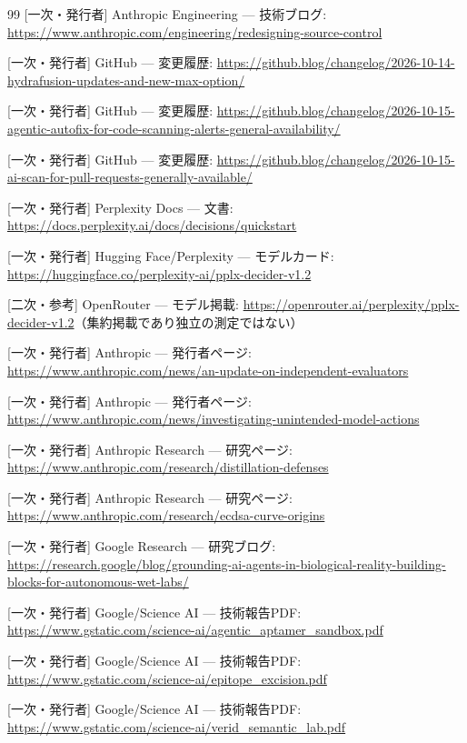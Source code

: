 \documentclass[lualatex,a4paper,10pt]{jlreq}
\begin{document}
\begin{thebibliography}{99}
 [一次・発行者] Anthropic Engineering — 技術ブログ: \url{https://www.anthropic.com/engineering/redesigning-source-control}

 [一次・発行者] GitHub — 変更履歴: \url{https://github.blog/changelog/2026-10-14-hydrafusion-updates-and-new-max-option/}

 [一次・発行者] GitHub — 変更履歴: \url{https://github.blog/changelog/2026-10-15-agentic-autofix-for-code-scanning-alerts-general-availability/}

 [一次・発行者] GitHub — 変更履歴: \url{https://github.blog/changelog/2026-10-15-ai-scan-for-pull-requests-generally-available/}

 [一次・発行者] Perplexity Docs — 文書: \url{https://docs.perplexity.ai/docs/decisions/quickstart}

 [一次・発行者] Hugging Face/Perplexity — モデルカード: \url{https://huggingface.co/perplexity-ai/pplx-decider-v1.2}

 [二次・参考] OpenRouter — モデル掲載: \url{https://openrouter.ai/perplexity/pplx-decider-v1.2}（集約掲載であり独立の測定ではない）

 [一次・発行者] Anthropic — 発行者ページ: \url{https://www.anthropic.com/news/an-update-on-independent-evaluators}

 [一次・発行者] Anthropic — 発行者ページ: \url{https://www.anthropic.com/news/investigating-unintended-model-actions}

 [一次・発行者] Anthropic Research — 研究ページ: \url{https://www.anthropic.com/research/distillation-defenses}

 [一次・発行者] Anthropic Research — 研究ページ: \url{https://www.anthropic.com/research/ecdsa-curve-origins}

 [一次・発行者] Google Research — 研究ブログ: \url{https://research.google/blog/grounding-ai-agents-in-biological-reality-building-blocks-for-autonomous-wet-labs/}

 [一次・発行者] Google/Science AI — 技術報告PDF: \url{https://www.gstatic.com/science-ai/agentic_aptamer_sandbox.pdf}

 [一次・発行者] Google/Science AI — 技術報告PDF: \url{https://www.gstatic.com/science-ai/epitope_excision.pdf}

 [一次・発行者] Google/Science AI — 技術報告PDF: \url{https://www.gstatic.com/science-ai/verid_semantic_lab.pdf}


\end{thebibliography}
\end{document}
